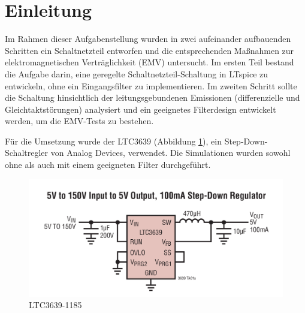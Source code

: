 \section{Einleitung} \label{sec:einleitung}

Im Rahmen dieser Aufgabenstellung wurden in zwei aufeinander aufbauenden Schritten ein Schaltnetzteil entworfen und die entsprechenden Maßnahmen zur elektromagnetischen Verträglichkeit (EMV) untersucht. Im ersten Teil bestand die Aufgabe darin, eine geregelte Schaltnetzteil-Schaltung in LTspice zu entwickeln, ohne ein Eingangsfilter zu implementieren. Im zweiten Schritt sollte die Schaltung hinsichtlich der leitungsgebundenen Emissionen (differenzielle und Gleichtaktstörungen) analysiert und ein geeignetes Filterdesign entwickelt werden, um die EMV-Tests zu bestehen.

Für die Umsetzung wurde der LTC3639 (Abbildung \ref{fig:LTC3639-1185}), ein Step-Down-Schaltregler von Analog Devices, verwendet. Die Simulationen wurden sowohl ohne als auch mit einem geeigneten Filter durchgeführt.


\begin{figure}[H]
    \centering
    \includegraphics[width=0.8\linewidth]{Figure/LTC3639-1185.png}
    \caption{LTC3639-1185}
    \label{fig:LTC3639-1185}
\end{figure}